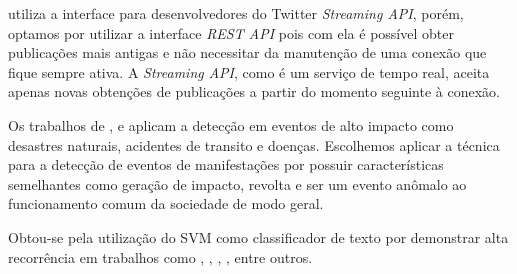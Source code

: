  utiliza a interface para desenvolvedores do Twitter \textit{Streaming API}, porém, optamos por utilizar a interface \textit{REST API} pois com ela é possível obter publicações mais antigas e não necessitar da manutenção de uma conexão que fique sempre ativa. A \textit{Streaming API}, como é um serviço de tempo real, aceita apenas novas obtenções de publicações a partir do momento seguinte à conexão.

Os trabalhos de ,  e  aplicam a detecção em eventos de alto impacto como desastres naturais, acidentes de transito e doenças. Escolhemos aplicar a técnica para a detecção de eventos de manifestações por possuir características semelhantes como geração de impacto, revolta e ser um evento anômalo ao funcionamento comum da sociedade de modo geral.

Obtou-se pela utilização do SVM como classificador de texto por demonstrar alta recorrência em trabalhos como , , , , entre outros.